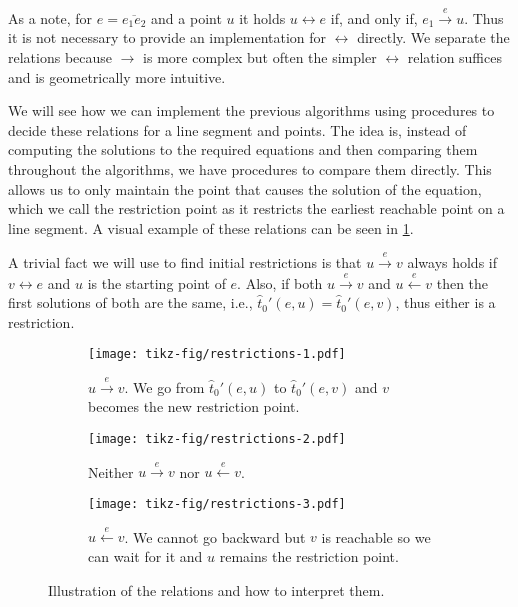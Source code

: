 As a note, for \(e = \overline{e_1e_2}\) and a point \(u\) it holds \(u \leftrightarrow e\) if, and only if, \(e_1 \overset{e}\rightarrow u\). Thus it is not necessary to provide an implementation for \(\leftrightarrow\) directly. We separate the relations because \(\rightarrow\) is more complex but often the simpler \(\leftrightarrow\) relation suffices and is geometrically more intuitive.

We will see how we can implement the previous algorithms using procedures to decide these relations for a line segment and points. The idea is, instead of computing the solutions to the required equations and then comparing them throughout the algorithms, we have procedures to compare them directly. This allows us to only maintain the point that causes the solution of the equation, which we call the restriction point as it restricts the earliest reachable point on a line segment. A visual example of these relations can be seen in \cref{fig:restrictions}.

A trivial fact we will use to find initial restrictions is that \(u \overset e\rightarrow v\) always holds if \(v \leftrightarrow e\) and \(u\) is the starting point of \(e\). Also, if both \(u \overset e\rightarrow v\) and \(u \overset e\leftarrow v\) then the first solutions of both are the same, i.e., \(\hat t_0'(e, u) = \hat t_0'(e,v)\), thus either is a restriction. 

\begin{figure}[ht]
  \centering
  \begin{subfigure}[t]{0.3\textwidth}
    \texttt{[image: tikz-fig/restrictions-1.pdf]}
    \caption{\(u \overset e\rightarrow v\). We go from \(\hat t_0'(e, u)\) to \(\hat t_0'(e, v)\) and \(v\) becomes the new restriction point.}
  \end{subfigure}
  \begin{subfigure}[t]{0.3\textwidth}
    \texttt{[image: tikz-fig/restrictions-2.pdf]}
    \caption{Neither \(u \overset e\rightarrow v\) nor \(u \overset e\leftarrow v\).}
  \end{subfigure}
  \begin{subfigure}[t]{0.3\textwidth}
    \texttt{[image: tikz-fig/restrictions-3.pdf]}
    \caption{\(u \overset e\leftarrow v\). We cannot go backward but \(v\) is reachable so we can wait for it and \(u\) remains the restriction point. }
  \end{subfigure}
  \caption{Illustration of the relations and how to interpret them. }
  \label{fig:restrictions}
\end{figure}

